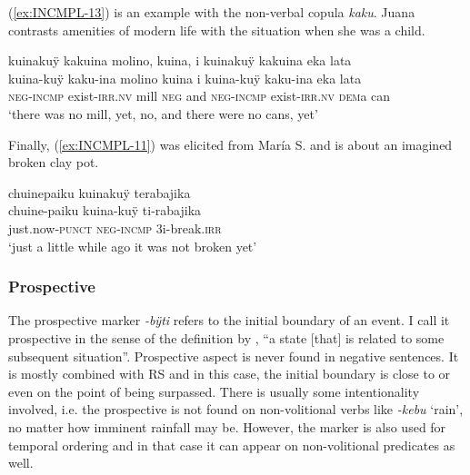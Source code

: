 (\ref{ex:INCMPL-13}) is an example with the non-verbal copula \textit{kaku}. Juana contrasts amenities of modern life with the situation when she was a child. 

\ea\label{ex:INCMPL-13}
\begingl
\glpreamble kuinakuÿ kakuina molino, kuina, i kuinakuÿ kakuina eka lata\\
\gla kuina-kuÿ kaku-ina molino kuina i kuina-kuÿ kaku-ina eka lata\\
\glb \textsc{neg}-\textsc{incmp} exist-\textsc{irr.nv} mill \textsc{neg} and \textsc{neg}-\textsc{incmp} exist-\textsc{irr.nv} \textsc{dem}a can\\
\glft ‘there was no mill, yet, no, and there were no cans, yet’
\endgl
\trailingcitation{[jxx-p120430l-2.504-507]}
\xe

Finally, (\ref{ex:INCMPL-11}) was elicited from María S. and is about an imagined broken clay pot.

\ea\label{ex:INCMPL-11}
\begingl
\glpreamble chuinepaiku kuinakuÿ terabajika\\
\gla chuine-paiku kuina-kuÿ ti-rabajika\\
\glb just.now-\textsc{punct} \textsc{neg}-\textsc{incmp} 3i-break.\textsc{irr}\\
\glft ‘just a little while ago it was not broken yet’
\endgl
{}
\xe





\subsubsection{Prospective}\label{sec:Prospective}

The prospective marker \textit{-bÿti} refers to the initial boundary of an event. I call it prospective in the sense of the definition by \citet[64]{Comrie1976}, “a state [that] is related to some subsequent situation”. Prospective aspect is never found in negative sentences. It is mostly combined with  RS and in this case, the initial boundary is close to or even on the point of being surpassed. There is usually some intentionality involved, i.e. the prospective is not found on non-volitional verbs like \textit{-kebu} ‘rain’, no matter how imminent rainfall may be. However, the marker is also used for temporal ordering and in that case it can appear on non-volitional predicates as well.

